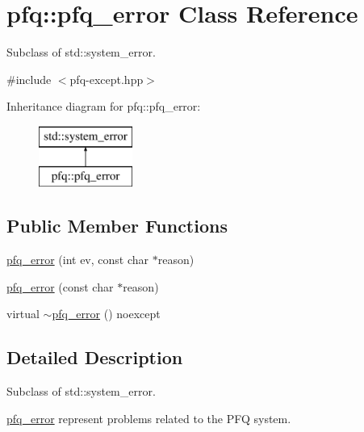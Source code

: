 \hypertarget{classpfq_1_1pfq__error}{\section{pfq\+:\+:pfq\+\_\+error Class Reference}
\label{classpfq_1_1pfq__error}
}


Subclass of std\+::system\+\_\+error.  




{\ttfamily \#include $<$pfq-\/except.\+hpp$>$}

Inheritance diagram for pfq\+:\+:pfq\+\_\+error\+:\begin{figure}[H]
\begin{center}
\leavevmode
\includegraphics[height=2.000000cm]{classpfq_1_1pfq__error}
\end{center}
\end{figure}
\subsection*{Public Member Functions}
\begin{DoxyCompactItemize}
\item 
\hyperlink{classpfq_1_1pfq__error_a200dca27eee04a6da834364b9342a81d}{pfq\+\_\+error} (int ev, const char $\ast$reason)
\item 
\hyperlink{classpfq_1_1pfq__error_a5af35c9d9dea6aceff0672b92ad6b844}{pfq\+\_\+error} (const char $\ast$reason)
\item 
virtual \hyperlink{classpfq_1_1pfq__error_a0aeb73a633e889817967897ef28b3512}{$\sim$pfq\+\_\+error} () noexcept
\end{DoxyCompactItemize}


\subsection{Detailed Description}
Subclass of std\+::system\+\_\+error. 

\hyperlink{classpfq_1_1pfq__error}{pfq\+\_\+error} represent problems related to the P\+F\+Q system. 

